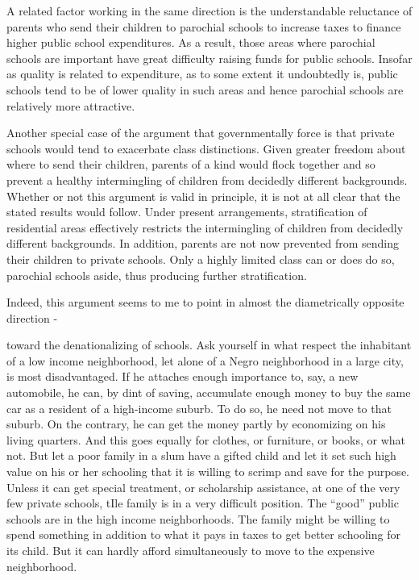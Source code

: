 \documentclass[11pt,openany]{book}
\begin{document}
A related factor working in the same direction is the understandable reluctance of parents who send their children to parochial schools to increase taxes to finance higher public school expenditures. As a result, those areas where parochial schools are important have great difficulty raising funds for public schools. Insofar as quality is related to expenditure, as to some extent it undoubtedly is, public schools tend to be of lower quality in such areas and hence parochial schools are relatively more attractive.

Another special case of the argument that governmentally force is that private schools would tend to exacerbate class distinctions. Given greater freedom about where to send their children, parents of a kind would flock together and so prevent a healthy intermingling of children from decidedly different backgrounds. Whether or not this argument is valid in principle, it is not at all clear that the stated results would follow. Under present arrangements, stratification of residential areas effectively restricts the intermingling of children from decidedly different backgrounds. In addition, parents are not now prevented from sending their children to private schools. Only a highly limited class can or does do so, parochial schools aside, thus producing further stratification.

Indeed, this argument seems to me to point in almost the diametrically opposite direction -

toward the denationalizing of schools. Ask yourself in what respect the inhabitant of a low income neighborhood, let alone of a Negro neighborhood in a large city, is most disadvantaged. If he attaches enough importance to, say, a new automobile, he can, by dint of saving, accumulate enough money to buy the same car as a resident of a high-income suburb. To do so, he need not move to that suburb. On the contrary, he can get the money partly by economizing on his living quarters. And this goes equally for clothes, or furniture, or books, or what not. But let a poor family in a slum have a gifted child and let it set such high value on his or her schooling that it is willing to scrimp and save for the purpose. Unless it can get special treatment, or scholarship assistance, at one of the very few private schools, tIle family is in a very difficult position. The ``good'' public schools are in the high income neighborhoods. The family might be willing to spend something in addition to what it pays in taxes to get better schooling for its child. But it can hardly afford simultaneously to move to the expensive neighborhood.
\end{document}
